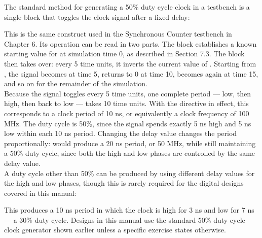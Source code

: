 The standard method for generating a 50\% duty cycle clock in a testbench is a single  block that toggles the clock signal after a fixed delay:\\


This is the same construct used in the Synchronous Counter testbench in Chapter 6. Its operation can be read in two parts. The  block establishes a known starting value for  at simulation time 0, as described in Section 7.3. The  block then takes over: every 5 time units, it inverts the current value of . Starting from , the signal becomes  at time 5, returns to 0 at time 10, becomes  again at time 15, and so on for the remainder of the simulation. \\ 


\noindent Because the signal toggles every 5 time units, one complete period — low, then high, then back to low — takes 10 time units. With the  directive in effect, this corresponds to a clock period of 10 ns, or equivalently a clock frequency of 100 MHz. The duty cycle is 50\%, since the signal spends exactly 5 ns high and 5 ns low within each 10 ns period. Changing the delay value changes the period proportionally:  would produce a 20 ns period, or 50 MHz, while still maintaining a 50\% duty cycle, since both the high and low phases are controlled by the same delay value. \\

A duty cycle other than 50\% can be produced by using different delay values for the high and low phases, though this is rarely required for the digital designs covered in this manual:



This produces a 10 ns period in which the clock is high for 3 ns and low for 7 ns — a 30\% duty cycle. Designs in this manual use the standard 50\% duty cycle clock generator shown earlier unless a specific exercise states otherwise.\\

